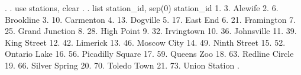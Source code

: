 {\smallskip}
. 
. use stations, clear
{\smallskip}
. 
. list station_id, sep(0)
{\smallskip}
     {\TLC}
     {\VBAR}           station_id {\VBAR}
     {\LFTT}
  1. {\VBAR}           3. Alewife {\VBAR}
  2. {\VBAR}         6. Brookline {\VBAR}
  3. {\VBAR}        10. Carmenton {\VBAR}
  4. {\VBAR}         13. Dogville {\VBAR}
  5. {\VBAR}         17. East End {\VBAR}
  6. {\VBAR}       21. Framington {\VBAR}
  7. {\VBAR}   25. Grand Junction {\VBAR}
  8. {\VBAR}       28. High Point {\VBAR}
  9. {\VBAR}       32. Irvingtown {\VBAR}
 10. {\VBAR}       36. Johnsville {\VBAR}
 11. {\VBAR}      39. King Street {\VBAR}
 12. {\VBAR}         42. Limerick {\VBAR}
 13. {\VBAR}      46. Moscow City {\VBAR}
 14. {\VBAR}     49. Ninth Street {\VBAR}
 15. {\VBAR}     52. Ontario Lake {\VBAR}
 16. {\VBAR} 56. Picadilly Square {\VBAR}
 17. {\VBAR}       59. Queens Zoo {\VBAR}
 18. {\VBAR}   63. Redline Circle {\VBAR}
 19. {\VBAR}    66. Silver Spring {\VBAR}
 20. {\VBAR}      70. Toledo Town {\VBAR}
 21. {\VBAR}    73. Union Station {\VBAR}
     {\BLC}
{\smallskip}
. 
